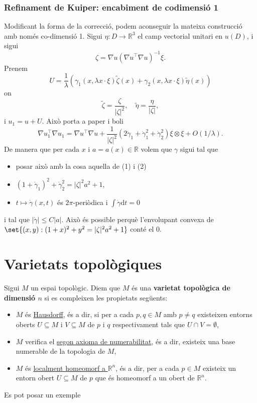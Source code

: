 \subsubsection{Refinament de Kuiper: encabiment de codimensió 1}
Modificant la forma de la correcció, podem aconseguir la mateixa construcció amb només co-dimensió 1. Sigui $\eta:D\to\mathbb R^{3}$ el camp vectorial unitari en $u(D)$, i sigui
$$\zeta = \nabla u (\nabla u^\intercal \nabla u)^{-1}\xi.$$
Prenem 
$$U = \frac1\lambda \left( \gamma_{1}(x, \lambda x \cdot \xi)\tilde{\zeta}(x) + \gamma_{2}(x, \lambda x \cdot \xi)\tilde{\eta}(x) \right)$$
on 
$$\tilde{\zeta} = \frac{\zeta}{|\zeta|^2}, \quad \tilde{\eta} = \frac{\eta}{|\zeta|},$$
i $u_1 = u + U$. Això porta a 
{\color{blue} paper i boli}
$$\nabla u_1^\intercal \nabla u_1 = \nabla u^\intercal \nabla u +\frac{1}{|\zeta|^2}\left( 2\dot\gamma_{1} + \dot\gamma_1^2 + \dot\gamma_{2}^2 \right) \xi \otimes \xi + O(1/\lambda).$$
De manera que per cada $x$ i $a=a(x)\in\mathbb R$ volem que $\gamma$ sigui tal que
\begin{itemize}
    \item {\color{blue} posar això amb la cosa aquella de (1) i (2)}
    \item $(1+\dot\gamma_1)^2+\dot\gamma_2^2=|\zeta|^2a^2+1$,
    \item $t \mapsto \dot\gamma(x,t)$ és $2\pi$-periòdica i $\int\dot\gamma\textrm{d}t=0$
\end{itemize}
i tal que $|\dot\gamma|\le C|a|$. Això és possible perquè l'envolupant convexa de $\set{(x,y):(1+x)^2+y^2 = |\zeta|^2a^2+1}$ conté el $0$. 




\newpage
\section{Varietats topològiques}
\begin{defi} 
    Sigui $M$ un espai topològic. Diem que $M$ és una \textbf{varietat topològica de dimensió $n$} si es compleixen les propietats següents:
    \begin{itemize}
        \item $M$ és \underline{Hausdorff}, és a dir, si per a cada $p,q\in M$ amb $p\neq q$ existeixen entorns oberts $U\subseteq M$ i $V\subseteq M$ de $p$ i $q$ respectivament tals que $U\cap V = \emptyset$,
        \item $M$ verifica el \underline{segon axioma de numerabilitat}, és a dir, existeix una base numerable de la topologia de $M$,
        \item $M$ és \underline{localment homeomorf a $\mathbb R^n$}, és a dir, per a cada $p\in M$ existeix un entorn obert $U\subseteq M$ de $p$ que és homeomorf a un obert de $\mathbb R^n$.
    \end{itemize}
\end{defi}
{\color{blue} Es pot posar un exemple}

